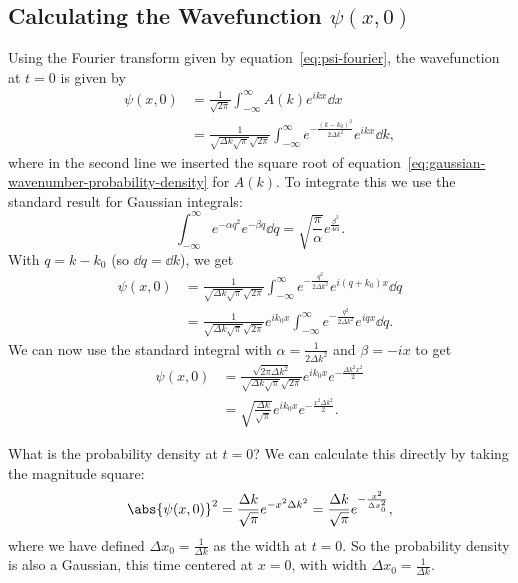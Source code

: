 \documentclass[../quantum_mechanics.tex]{subfiles}
\begin{document}
        \subsection{Calculating the Wavefunction $\psi(x,0)$}\label{subsec:calculating-the-wavefunction}
            Using the Fourier transform given by equation~\ref{eq:psi-fourier}, the wavefunction at $t=0$ is given by
            \begin{align}
                \psi(x,0)&=\frac{1}{\sqrt{2\pi}}\int_{-\infty}^\infty A(k)e^{ikx}\dd{x}\\
                &=\frac{1}{\sqrt{\Delta k\sqrt{\pi}}\sqrt{2\pi}}\int_{-\infty}^\infty e^{-\frac{(k-k_0)^2}{2\Delta k^2}}e^{ikx}\dd{k},
            \end{align}
            where in the second line we inserted the square root of equation~\ref{eq:gaussian-wavenumber-probability-density} for $A(k)$.
            To integrate this we use the standard result for Gaussian integrals:
            \begin{equation}\label{eq:gaussian-standard-integral}
                \int_{-\infty}^\infty e^{-\alpha q^2}e^{-\beta q}\dd{q}=\sqrt{\frac{\pi}{\alpha}}e^{\frac{\beta^2}{4\alpha}}.
            \end{equation}
            With $q=k-k_0$ (so $\dd{q}=\dd{k}$), we get
            \begin{align}
                \psi(x,0)&=\frac{1}{\sqrt{\Delta k\sqrt{\pi}}\sqrt{2\pi}}\int_{-\infty}^\infty e^{-\frac{q^2}{2\Delta k^2}}e^{i(q+k_0)x}\dd{q}\\
                &=\frac{1}{\sqrt{\Delta k\sqrt{\pi}}\sqrt{2\pi}}e^{ik_0x}\int_{-\infty}^\infty e^{-\frac{q^2}{2\Delta k^2}}e^{iqx}\dd{q}.
            \end{align}
            We can now use the standard integral with $\alpha=\frac{1}{2\Delta k^2}$ and $\beta=-ix$ to get
            \begin{align}
                \psi(x,0)&=\frac{\sqrt{2\pi\Delta k^2}}{\sqrt{\Delta k\sqrt{\pi}}\sqrt{2\pi}}e^{ik_0x}e^{-\frac{\Delta k^2x^2}{2}}\\
                &=\sqrt{\frac{\Delta k}{\sqrt{\pi}}}e^{ik_0x}e^{-\frac{x^2\Delta k^2}{2}}.
            \end{align}

            What is the probability density at $t=0$?
            We can calculate this directly by taking the magnitude square:
            \begin{equation}
                \abs{\psi(x,0)}^2=\frac{\Delta k}{\sqrt{\pi}}e^{-x^2\Delta k^2}=\frac{\Delta k}{\sqrt{\pi}}e^{-\frac{x^2}{\Delta x_0^2}},
            \end{equation}
            where we have defined $\Delta x_0=\frac{1}{\Delta k}$ as the width at $t=0$.
            So the probability density is also a Gaussian, this time centered at $x=0$, with width $\Delta x_0=\frac{1}{\Delta k}$.
\end{document}
